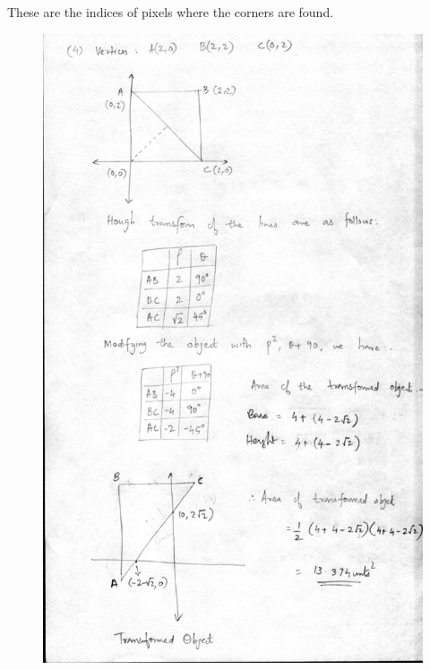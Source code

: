 \documentclass{article}
\begin{document}
These are the indices of pixels where the corners are found.

\begin{figure}
\includegraphics[width=17cm]{qn4.jpg}
\end{figure}
\end{document}
